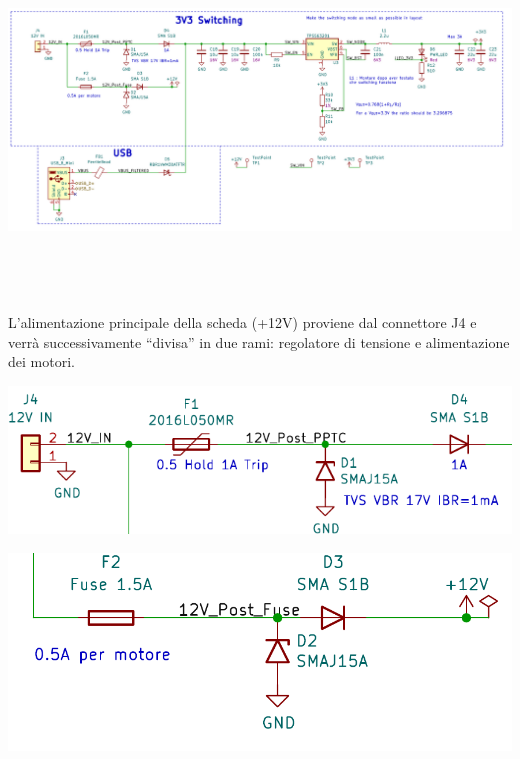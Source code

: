 \begin{center}
\includegraphics[width=6.5in,height=3.65278in]{figures/image65.png}
\captionsetup{type=figure}
\end{center}

L'alimentazione principale della scheda (+12V) proviene dal connettore
J4 e verrà successivamente ``divisa'' in due rami: regolatore di
tensione e alimentazione dei motori.

\begin{center}
\includegraphics[scale=0.8]{figures/image80.png}
\captionsetup{type=figure}
\end{center}

\begin{center}
\includegraphics[scale=0.6]{figures/image64.png}
\captionsetup{type=figure}
\end{center}

